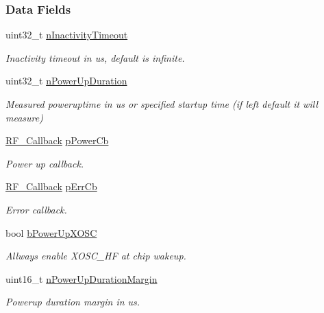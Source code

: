 \subsubsection*{Data Fields}
\begin{DoxyCompactItemize}
\item 
uint32\+\_\+t \hyperlink{struct_r_f___params_a01d3752799ea4318bbf9d1384cb49b97}{n\+Inactivity\+Timeout}
\begin{DoxyCompactList}\small\item\em Inactivity timeout in us, default is infinite. \end{DoxyCompactList}\item 
uint32\+\_\+t \hyperlink{struct_r_f___params_a58dc682aa09acabe6411ea186dd3aebf}{n\+Power\+Up\+Duration}
\begin{DoxyCompactList}\small\item\em Measured poweruptime in us or specified startup time (if left default it will measure) \end{DoxyCompactList}\item 
\hyperlink{_r_f_8h_a4d2ce6dc70b0f329dc5e249ec10c574a}{R\+F\+\_\+\+Callback} \hyperlink{struct_r_f___params_ae683ebc129d40a11fb9ec7e371f1e11b}{p\+Power\+Cb}
\begin{DoxyCompactList}\small\item\em Power up callback. \end{DoxyCompactList}\item 
\hyperlink{_r_f_8h_a4d2ce6dc70b0f329dc5e249ec10c574a}{R\+F\+\_\+\+Callback} \hyperlink{struct_r_f___params_ab7be231b23fab2503b8c54b474fba74d}{p\+Err\+Cb}
\begin{DoxyCompactList}\small\item\em Error callback. \end{DoxyCompactList}\item 
bool \hyperlink{struct_r_f___params_a66feaf5103de9d0b45085c7c44ea918b}{b\+Power\+Up\+X\+O\+S\+C}
\begin{DoxyCompactList}\small\item\em Allways enable X\+O\+S\+C\+\_\+\+H\+F at chip wakeup. \end{DoxyCompactList}\item 
uint16\+\_\+t \hyperlink{struct_r_f___params_a848ebeabce42f87f6a1d4f51f908dbe4}{n\+Power\+Up\+Duration\+Margin}
\begin{DoxyCompactList}\small\item\em Powerup duration margin in us. \end{DoxyCompactList}\end{DoxyCompactItemize}



